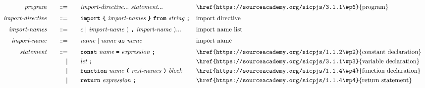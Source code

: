 \addtolength{\jot}{-0.5mm}
\begin{alignat*}{9}
&& \textit{program}    &&\quad ::= &\quad && \textit{import-directive} ... \ \textit{statement} ...
                                                           && \textrm{\href{https://sourceacademy.org/sicpjs/3.1.1\#p6}{program}} \\[1mm]
&& \textit{import-directive}    &&\quad ::= &\quad && \textbf{\texttt{import}}\ \textbf{\texttt{\{}}\ \textit{import-names} \ \textbf{\texttt{\}}}\ \textbf{\texttt{from}}\  \textit{string} \ \textbf{\texttt{;}}
                                                           && \textrm{import directive} \\[1mm]
&& \textit{import-names}   && ::= &\quad &&  \epsilon\ | \  \textit{import-name} \ 
                                                   (\ \textbf{\texttt{,}} \ \textit{import-name}\ ) ...
                                                            && \textrm{import name list}   \\[1mm]
&& \textit{import-name}   && ::= &\quad &&  \textit{name}\ | \  \textit{name} \ \textbf{\texttt{as}}\ \textit{name} 
                                                            && \textrm{import name}   \\[1mm]
&& \textit{statement}    &&\quad ::= &\quad && \textbf{\texttt{const}}\  \textit{name} \ 
                                           \textbf{\texttt{=}}\  \textit{expression} \ \textbf{\texttt{;}}
                                                           && \textrm{\href{https://sourceacademy.org/sicpjs/1.1.2\#p2}{constant declaration}} \\
&&                       && |   &\quad && \textit{let} \ \textbf{\texttt{;}}
                                                           && \textrm{\href{https://sourceacademy.org/sicpjs/3.1.1\#p3}{variable declaration}} \\
&&                       && |   &\quad && \textbf{\texttt{function}}\  \textit{name} \ 
                                   \textbf{\texttt{(}}\  \textit{rest-names} \ \textbf{\texttt{)}}\ \textit{block} \quad
                                                           && \textrm{\href{https://sourceacademy.org/sicpjs/1.1.4\#p4}{function declaration}}\\
&&                       && |   &\quad && \textbf{\texttt{return}}\  \textit{expression} \ \textbf{\texttt{;}}
                                                           && \textrm{\href{https://sourceacademy.org/sicpjs/1.1.4\#p4}{return statement}}\\

\end{alignat*}

